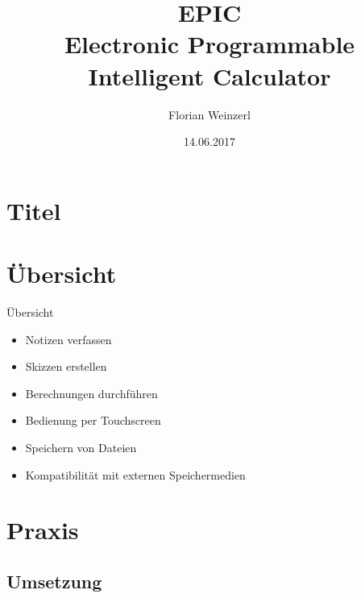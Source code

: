 \documentclass{beamer}
\title[Your Short Title]{EPIC\\\large{Electronic Programmable Intelligent Calculator}}
\author{Florian Weinzerl}
\institute{HTL Hollabrunn}
\date{14.06.2017}
\begin{document}
\section{Titel}

\begin{frame}
  \titlepage
\end{frame}


\section{Übersicht}

\begin{frame}{Übersicht}

	
	\begin{itemize}
	  \item Notizen verfassen
	  \item Skizzen erstellen
	  \item Berechnungen durchführen
	  \item Bedienung per Touchscreen
	  \item Speichern von Dateien
	  \item Kompatibilität mit externen Speichermedien
	\end{itemize}


\end{frame}

\section{Praxis}

\subsection{Umsetzung}
\end{document}
